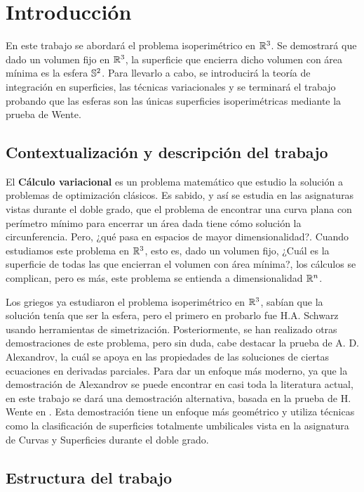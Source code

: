 \section{Introducción}

En este trabajo se abordará el problema isoperimétrico en $\mathbb{R}^3$. Se demostrará que dado un volumen fijo en $\mathbb{R}^3$, la superficie que encierra dicho volumen con área mínima es la esfera $\mathbb{S}^2$. Para llevarlo a cabo, se introducirá la teoría de integración en superficies, las técnicas variacionales y se terminará el trabajo probando que las esferas son las únicas superficies isoperimétricas mediante la prueba de Wente.

\subsection{Contextualización y descripción del trabajo}

El \textbf{Cálculo variacional} es un problema matemático que estudio la solución a problemas de optimización clásicos. Es sabido, y así se estudia en las asignaturas vistas durante el doble grado, que el problema de encontrar una curva plana con perímetro mínimo para encerrar un área dada tiene cómo solución la circunferencia. Pero, ¿qué pasa en espacios de mayor dimensionalidad?. Cuando estudiamos este problema en $\mathbb{R}^3$, esto es, dado un volumen fijo, ¿Cuál es la superficie de todas las que encierran el volumen con área mínima?, los cálculos se complican, pero es más, este problema se entienda a dimensionalidad $\mathbb{R}^n$.

Los griegos ya estudiaron el problema isoperimétrico en $\mathbb{R}^3$, sabían que la solución tenía que ser la esfera, pero el primero en probarlo fue H.A. Schwarz usando herramientas de simetrización. Posteriormente, se han realizado otras demostraciones de este problema, pero sin duda, cabe destacar la prueba de A. D. Alexandrov, la cuál se apoya en las propiedades de las soluciones de ciertas ecuaciones en derivadas parciales. Para dar un enfoque más moderno, ya que la demostración de Alexandrov se puede encontrar en casi toda la literatura actual, en este trabajo se dará una demostración alternativa, basada en la prueba de H. Wente en \cite{wenteproof}. Esta demostración tiene un enfoque más geométrico y utiliza técnicas como la clasificación de superficies totalmente umbilicales vista en la asignatura de Curvas y Superficies durante el doble grado.

\subsection{Estructura del trabajo}


